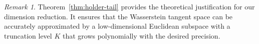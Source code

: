\documentclass{article}
\theoremstyle{plain}
\theoremstyle{definition}
\newtheorem{assumption}[theorem]{Assumption}
\theoremstyle{remark}
\newtheorem{remark}[theorem]{Remark}
\begin{document}
\begin{remark}
    Theorem~\ref{thm:holder-tail} provides the theoretical justification for our dimension reduction. It ensures that the Wasserstein tangent space can be accurately approximated by a low-dimensional Euclidean subspace with a truncation level $K$ that grows polynomially with the desired precision.
\end{remark} 










\end{document}
